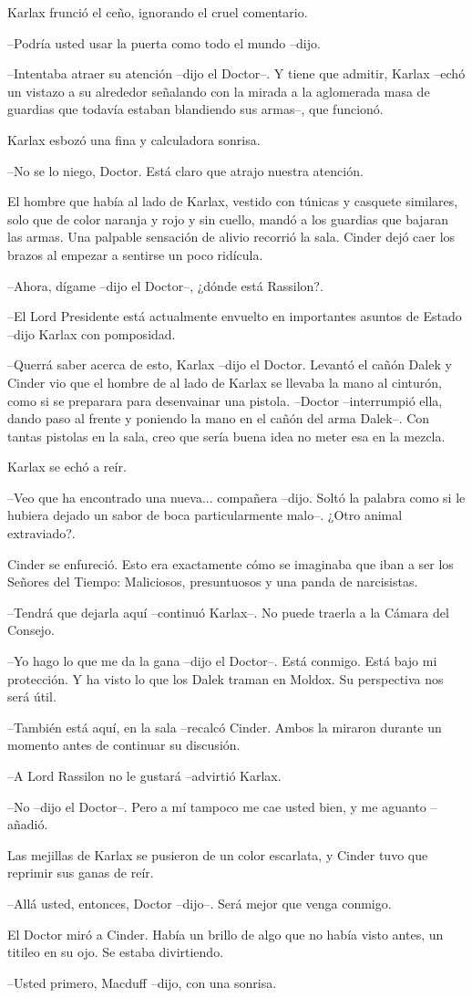 Karlax frunció el ceño, ignorando el cruel comentario.

--Podría usted usar la puerta como todo el mundo --dijo.

--Intentaba atraer su atención --dijo el Doctor--. Y tiene que admitir, Karlax --echó un vistazo a su alrededor señalando con la mirada a la aglomerada masa de guardias que todavía estaban blandiendo sus armas--, que funcionó.

Karlax esbozó una fina y calculadora sonrisa.

--No se lo niego, Doctor. Está claro que atrajo nuestra atención.

El hombre que había al lado de Karlax, vestido con túnicas y casquete similares, solo que de color naranja y rojo y sin cuello, mandó a los guardias que bajaran las armas. Una palpable sensación de alivio recorrió la sala. Cinder dejó caer los brazos al empezar a sentirse un poco ridícula.

--Ahora, dígame --dijo el Doctor--, ¿dónde está Rassilon?.

--El Lord Presidente está actualmente envuelto en importantes asuntos de Estado --dijo Karlax con pomposidad.

--Querrá saber acerca de esto, Karlax --dijo el Doctor. Levantó el cañón Dalek y Cinder vio que el hombre de al lado de Karlax se llevaba la mano al cinturón, como si se preparara para desenvainar una pistola.
--Doctor --interrumpió ella, dando paso al frente y poniendo la mano en el cañón del arma Dalek--. Con tantas pistolas en la sala, creo que sería buena idea no meter esa en la mezcla.

Karlax se echó a reír.

--Veo que ha encontrado una nueva... compañera --dijo. Soltó la palabra como si le hubiera dejado un sabor de boca particularmente malo--. ¿Otro animal extraviado?.

Cinder se enfureció. Esto era exactamente cómo se imaginaba que iban a ser los Señores del Tiempo: Maliciosos, presuntuosos y una panda de narcisistas.

--Tendrá que dejarla aquí --continuó Karlax--. No puede traerla a la Cámara del Consejo.

--Yo hago lo que me da la gana --dijo el Doctor--. Está conmigo. Está bajo mi protección. Y ha visto lo que los Dalek traman en Moldox. Su perspectiva nos será útil.

--También está aquí, en la sala --recalcó Cinder. Ambos la miraron durante un momento antes de continuar su discusión.

--A Lord Rassilon no le gustará --advirtió Karlax.

--No --dijo el Doctor--. Pero a mí tampoco me cae usted bien, y me aguanto --añadió.

Las mejillas de Karlax se pusieron de un color escarlata, y Cinder tuvo que reprimir sus ganas de reír.

--Allá usted, entonces, Doctor --dijo--. Será mejor que venga conmigo.

El Doctor miró a Cinder. Había un brillo de algo que no había visto antes, un titileo en su ojo. Se estaba divirtiendo.

--Usted primero, Macduff --dijo, con una sonrisa.

